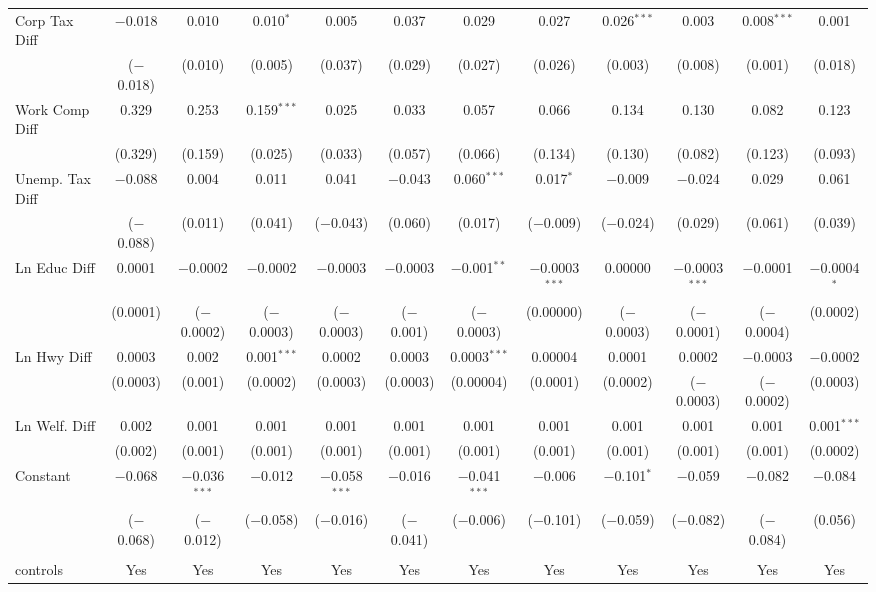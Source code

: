 \begin{table}[!htbp]
\begin{tabular}{@{\extracolsep{5pt}}lccccccccccc}
  Corp Tax Diff & $-$0.018 & 0.010 & 0.010$^{*}$ & 0.005 & 0.037 & 0.029 & 0.027 & 0.026$^{***}$ & 0.003 & 0.008$^{***}$ & 0.001 \\ 
  & ($-$0.018) & (0.010) & (0.005) & (0.037) & (0.029) & (0.027) & (0.026) & (0.003) & (0.008) & (0.001) & (0.018) \\ 
  Work Comp Diff & 0.329 & 0.253 & 0.159$^{***}$ & 0.025 & 0.033 & 0.057 & 0.066 & 0.134 & 0.130 & 0.082 & 0.123 \\ 
  & (0.329) & (0.159) & (0.025) & (0.033) & (0.057) & (0.066) & (0.134) & (0.130) & (0.082) & (0.123) & (0.093) \\ 
  Unemp. Tax Diff & $-$0.088 & 0.004 & 0.011 & 0.041 & $-$0.043 & 0.060$^{***}$ & 0.017$^{*}$ & $-$0.009 & $-$0.024 & 0.029 & 0.061 \\ 
  & ($-$0.088) & (0.011) & (0.041) & ($-$0.043) & (0.060) & (0.017) & ($-$0.009) & ($-$0.024) & (0.029) & (0.061) & (0.039) \\ 
  Ln Educ Diff & 0.0001 & $-$0.0002 & $-$0.0002 & $-$0.0003 & $-$0.0003 & $-$0.001$^{**}$ & $-$0.0003$^{***}$ & 0.00000 & $-$0.0003$^{***}$ & $-$0.0001 & $-$0.0004$^{*}$ \\ 
  & (0.0001) & ($-$0.0002) & ($-$0.0003) & ($-$0.0003) & ($-$0.001) & ($-$0.0003) & (0.00000) & ($-$0.0003) & ($-$0.0001) & ($-$0.0004) & (0.0002) \\ 
  Ln Hwy Diff & 0.0003 & 0.002 & 0.001$^{***}$ & 0.0002 & 0.0003 & 0.0003$^{***}$ & 0.00004 & 0.0001 & 0.0002 & $-$0.0003 & $-$0.0002 \\ 
  & (0.0003) & (0.001) & (0.0002) & (0.0003) & (0.0003) & (0.00004) & (0.0001) & (0.0002) & ($-$0.0003) & ($-$0.0002) & (0.0003) \\ 
  Ln Welf. Diff & 0.002 & 0.001 & 0.001 & 0.001 & 0.001 & 0.001 & 0.001 & 0.001 & 0.001 & 0.001 & 0.001$^{***}$ \\ 
  & (0.002) & (0.001) & (0.001) & (0.001) & (0.001) & (0.001) & (0.001) & (0.001) & (0.001) & (0.001) & (0.0002) \\ 
  Constant & $-$0.068 & $-$0.036$^{***}$ & $-$0.012 & $-$0.058$^{***}$ & $-$0.016 & $-$0.041$^{***}$ & $-$0.006 & $-$0.101$^{*}$ & $-$0.059 & $-$0.082 & $-$0.084 \\ 
  & ($-$0.068) & ($-$0.012) & ($-$0.058) & ($-$0.016) & ($-$0.041) & ($-$0.006) & ($-$0.101) & ($-$0.059) & ($-$0.082) & ($-$0.084) & (0.056) \\ 
 \hline \\[-1.8ex] 
controls & Yes & Yes & Yes & Yes & Yes & Yes & Yes & Yes & Yes & Yes & Yes \\ 

\end{tabular}
\end{table}
